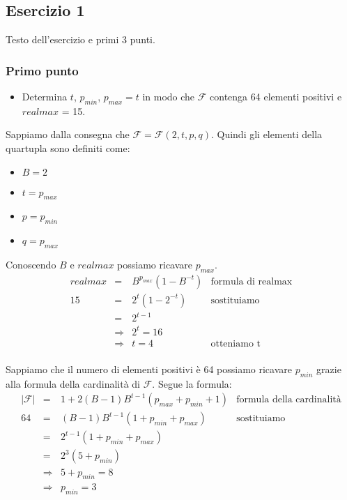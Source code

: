 \subsection{Esercizio 1}
Testo dell'esercizio e primi 3 punti.

\subsubsection{Primo punto}
\begin{itemize}
  \item Determina $t$, $p_{min}$, $p_{max} = t$ in modo che $\mathcal{F}$ contenga 64 elementi positivi e $realmax$ = 15.
\end{itemize}

Sappiamo dalla consegna che $ \mathcal{F} = \mathcal{F}(2,t,p,q) $. Quindi gli elementi della quartupla sono definiti come:
\begin{itemize}
  \item[] $B = 2$
  \item[] $t = p_{max}$
  \item[] $p = p_{min}$
  \item[] $q = p_{max}$
\end{itemize}

Conoscendo $B$ e $realmax$ possiamo ricavare $p_{max}$.
\[
\renewcommand{\arraystretch}{2.0}
\begin{array}{rclr}
    realmax & = & B^{p_{max}}(1-B^{-t}) & \text{formula di realmax} \\
    15 & = & 2^t(1-2^{-t}) & \text{sostituiamo} \\
     & = & 2^{t-1}\\
     & \Rightarrow & 2^t = 16\\
     & \Rightarrow & t = 4 & \text{otteniamo t}\\
\end{array}
\]


Sappiamo che il numero di elementi positivi è 64 possiamo ricavare $p_{min}$ grazie alla formula della cardinalità di $\mathcal{F}$. Segue la formula:
\[
\renewcommand{\arraystretch}{2.0}
\begin{array}{rclr}
    |\mathcal{F}| & = & 1+2(B-1)B^{t-1}(p_{max}+p_{min}+1) & \text{formula della cardinalità} \\
    64 & = & (B-1)B^{t-1} (1 + p_{min} + p_{max}) & \text{sostituiamo} \\
     & = & 2^{t-1} (1 + p_{min} + p_{max})\\
     & = & 2^3 (5 + p_{min})\\
     & \Rightarrow & 5 + p_{min} = 8\\
     & \Rightarrow & p_{min} = 3\\
\end{array}
\]

